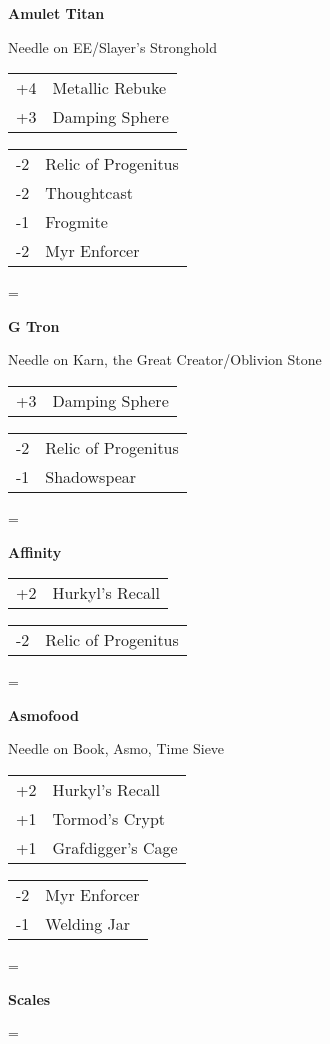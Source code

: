 \documentclass[fontsize=12pt,paper=a4]{scrartcl}
\newenvironment{absolutelynopagebreak}
  {\par\nobreak\vfil\penalty0\vfilneg
   \vtop\bgroup}
  {\par\xdef\tpd{\the\prevdepth}\egroup
   \prevdepth=\tpd}
\newenvironment{decklist}{%
    \begin{tabular}{>{\hspace{-4pt}}r<{\hspace{-3pt}}>{\hspace{-3pt}}l<{\hspace{-4pt}}}
    }{%
    \end{tabular}
    \par
}
\newcommand{\card}[2]{#1 & #2\\}
\newenvironment{sideboardguide}{%
    \newpage
    \begin{multicols}{4}
        \begin{tiny}
        }{%
        \end{tiny}
    \end{multicols}
}
\newenvironment{matchup}[1]{%
    \begin{absolutelynopagebreak}
        \textbf{#1}\par
    }{%
    \end{absolutelynopagebreak}
    \par\vspace{2em}
}
\newenvironment{notes}{%
}{%
    \par
}
\begin{document}
\begin{sideboardguide}
\begin{matchup}{Amulet Titan}
        \begin{notes}
            Needle on EE/Slayer's Stronghold
        \end{notes}
        \begin{decklist}
            \card{+4}{Metallic Rebuke}
            \card{+3}{Damping Sphere}
        \end{decklist}
        \begin{decklist}
            \card{-2}{Relic of Progenitus}
            \card{-2}{Thoughtcast}
            \card{-1}{Frogmite}
            \card{-2}{Myr Enforcer}
        \end{decklist}
    \end{matchup}
    \begin{matchup}{G Tron}
        \begin{notes}
            Needle on Karn, the Great Creator/Oblivion Stone
        \end{notes}
        \begin{decklist}
            \card{+3}{Damping Sphere}
        \end{decklist}
        \begin{decklist}
            \card{-2}{Relic of Progenitus}
            \card{-1}{Shadowspear}
        \end{decklist}
    \end{matchup}
    \begin{matchup}{Affinity}
        \begin{decklist}
            \card{+2}{Hurkyl's Recall}
        \end{decklist}
        \begin{decklist}
            \card{-2}{Relic of Progenitus}
        \end{decklist}
    \end{matchup}
    \begin{matchup}{Asmofood}
        \begin{notes}
            Needle on Book, Asmo, Time Sieve
        \end{notes}
        \begin{decklist}
            \card{+2}{Hurkyl's Recall}
            \card{+1}{Tormod's Crypt}
            \card{+1}{Grafdigger's Cage}
        \end{decklist}
        \begin{decklist}
            \card{-2}{Myr Enforcer}
            \card{-1}{Welding Jar}
        \end{decklist}
    \end{matchup}
    \begin{matchup}{Scales}

\end{matchup}
\end{sideboardguide}
\end{document}
